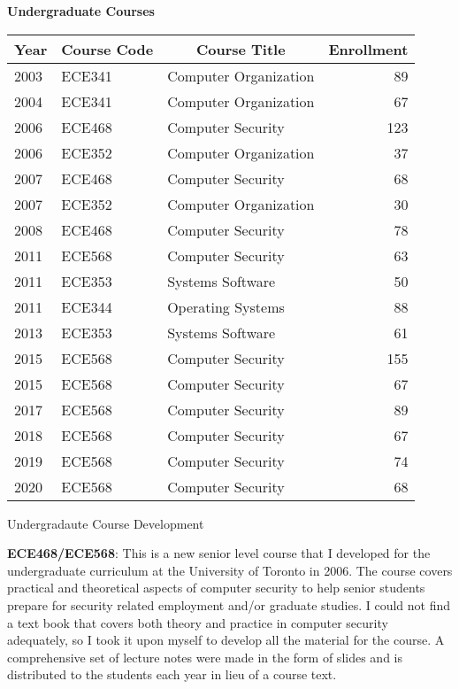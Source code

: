 \documentclass[10pt]{article}
\newenvironment{lonelist}[1][\enskip\textbullet]%
        {\vspace{-\baselineskip}\begin{list}{#1}{%
        \setlength{\partopsep}{0pt}%
        \setlength{\topsep}{0pt}
	\setlength{\leftmargin}{0pt}}}
        {\end{list}\vspace{-.6\baselineskip}}
\newenvironment{innerlist}[1][\enskip\textbullet]%
        {\begin{compactitem}[#1]}{\end{compactitem}}
\begin{document}
\begin{lonelist}
\item[] {\bf Undergraduate Courses}
\begin{longtable}[h]{|l|l|p{190pt}|r|} \hline
\multicolumn{1}{|c|}{\bf Year} &
\multicolumn{1}{|c|}{\bf Course Code} &
\multicolumn{1}{|c|}{\bf Course Title} &
\multicolumn{1}{|c|}{\bf Enrollment} \\ \hline \hline
2003 & ECE341 & Computer Organization & 89 \\ \hline
2004 & ECE341 & Computer Organization & 67 \\ \hline
2006 & ECE468 & Computer Security & 123 \\ \hline
2006 & ECE352 & Computer Organization & 37 \\ \hline
2007 & ECE468 & Computer Security & 68 \\ \hline
2007 & ECE352 & Computer Organization & 30 \\ \hline
2008 & ECE468 & Computer Security & 78 \\ \hline
2011 & ECE568 & Computer Security & 63 \\ \hline
2011 & ECE353 & Systems Software & 50 \\ \hline
2011 & ECE344 & Operating Systems & 88 \\ \hline
2013 & ECE353 & Systems Software & 61 \\ \hline
2015 & ECE568 & Computer Security & 155 \\ \hline
2015 & ECE568 & Computer Security & 67 \\ \hline
2017 & ECE568 & Computer Security & 89 \\ \hline
2018 & ECE568 & Computer Security & 67 \\ \hline
2019 & ECE568 & Computer Security & 74 \\ \hline
2020 & ECE568 & Computer Security & 68 \\ \hline
\end{longtable}
\item[] {Undergradaute Course Development}
\begin{innerlist}
\item[] {\bf ECE468/ECE568}: This is a new senior level course that I developed for the undergraduate curriculum at the University of Toronto in 2006.  The course covers practical and theoretical aspects of computer security to help senior students prepare for security related employment and/or graduate studies.  I could not find a text book that covers both theory and practice in computer security adequately, so I took it upon myself to develop all the material for the course.  A comprehensive set of lecture notes were made in the form of slides and is distributed to the students each year in lieu of a course text.


\end{innerlist}
\end{lonelist}
\end{document}
